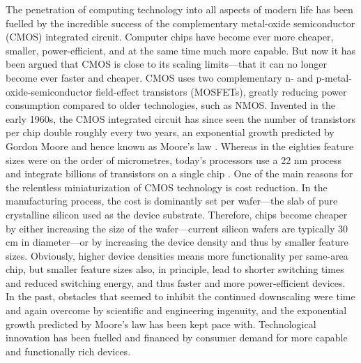 The penetration of computing technology into all aspects of modern life has been
fuelled by the incredible success of the complementary metal-oxide semiconductor
(CMOS) integrated circuit. Computer chips have become ever more cheaper,
smaller, power-efficient, and at the same time much more capable. But now it has
been argued that CMOS is close to its scaling limits---that it can no longer
become ever faster and cheaper. CMOS uses two complementary n- and
p-metal-oxide-semiconductor field-effect transistors (MOSFETs), greatly reducing
power consumption compared to older technologies, such as NMOS. Invented in the
early 1960s, the CMOS integrated circuit has since seen the number of
transistors per chip double roughly every two years, an exponential growth
predicted by Gordon Moore and hence known as Moore's law
\cite{moore1965cramming}. Whereas in the eighties feature sizes were on the
order of micrometres, today's processors use a 22 nm process and integrate
billions of transistors on a single chip \cite{bohr2011evolution}. One of the
main reasons for the relentless miniaturization of CMOS technology is cost
reduction. In the manufacturing process, the cost is dominantly set per
wafer---the slab of pure crystalline silicon used as the device substrate.
Therefore, chips become cheaper by either increasing the size of the
wafer---current silicon wafers are typically 30 cm in diameter---or by
increasing the device density and thus by smaller feature sizes. Obviously,
higher device densities means more functionality per same-area chip, but smaller
feature sizes also, in principle, lead to shorter switching times and reduced
switching energy, and thus faster and more power-efficient devices. In the past,
obstacles that seemed to inhibit the continued downscaling were time and again
overcome by scientific and engineering ingenuity, and the exponential growth
predicted by Moore's law has been kept pace with. Technological innovation has
been fuelled and financed by consumer demand for more capable and functionally
rich devices.

